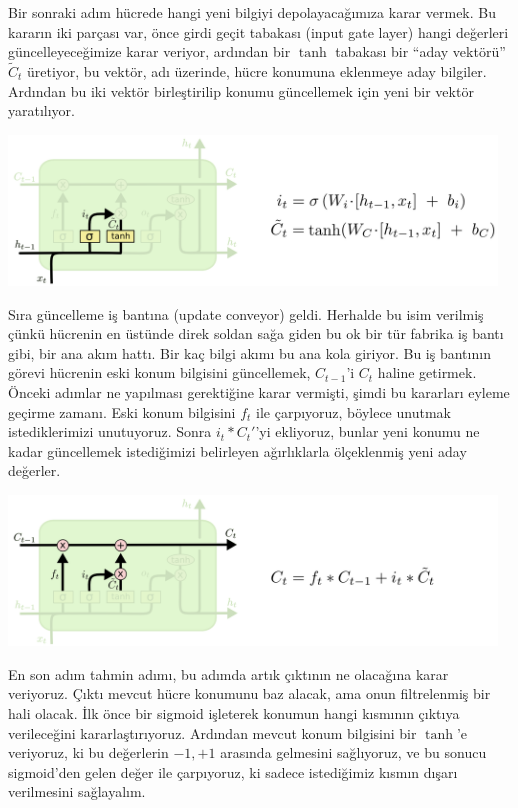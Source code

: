 \documentclass[12pt,fleqn]{article}\usepackage{../../common}
\begin{document}
Bir sonraki adım hücrede hangi yeni bilgiyi depolayacağımıza karar
vermek. Bu kararın iki parçası var, önce girdi geçit tabakası (input gate
layer) hangi değerleri güncelleyeceğimize karar veriyor, ardından bir
$\tanh$ tabakası bir ``aday vektörü'' $\tilde{C}_t$ üretiyor, bu vektör,
adı üzerinde, hücre konumuna eklenmeye aday bilgiler. Ardından bu iki
vektör birleştirilip konumu güncellemek için yeni bir vektör yaratılıyor.

\includegraphics[width=35em]{lstm_05.png}

Sıra güncelleme iş bantına (update conveyor) geldi. Herhalde bu isim
verilmiş çünkü hücrenin en üstünde direk soldan sağa giden bu ok bir tür
fabrika iş bantı gibi, bir ana akım hattı. Bir kaç bilgi akımı bu ana kola
giriyor. Bu iş bantının görevi hücrenin eski konum bilgisini güncellemek,
$C_{t-1}$'i $C_t$ haline getirmek. Önceki adımlar ne yapılması gerektiğine
karar vermişti, şimdi bu kararları eyleme geçirme zamanı. Eski konum
bilgisini $f_t$ ile çarpıyoruz, böylece unutmak istediklerimizi
unutuyoruz. Sonra $i_t * C_t'$'yi ekliyoruz, bunlar yeni konumu ne kadar
güncellemek istediğimizi belirleyen ağırlıklarla ölçeklenmiş yeni aday
değerler.

\includegraphics[width=35em]{lstm_06.png}

En son adım tahmin adımı, bu adımda artık çıktının ne olacağına karar
veriyoruz. Çıktı mevcut hücre konumunu baz alacak, ama onun filtrelenmiş
bir hali olacak. İlk önce bir sigmoid işleterek konumun hangi kısmının
çıktıya verileceğini kararlaştırıyoruz. Ardından mevcut konum bilgisini bir
$\tanh$'e veriyoruz, ki bu değerlerin $-1,+1$ arasında gelmesini
sağlıyoruz, ve bu sonucu sigmoid'den gelen değer ile çarpıyoruz, ki sadece
istediğimiz kısmın dışarı verilmesini sağlayalım. 
\end{document}
